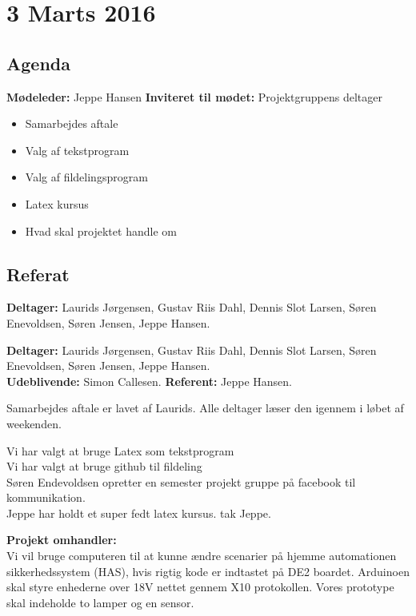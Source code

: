 \chapter*{3 Marts 2016}

\section*{Agenda}

\textbf{Mødeleder:} Jeppe Hansen
\textbf{Inviteret til mødet:} Projektgruppens deltager

\begin{itemize}
	\item Samarbejdes aftale
	\item Valg af tekstprogram
	\item Valg af fildelingsprogram
	\item Latex kursus
	\item Hvad skal projektet handle om
\end{itemize}

\section*{Referat}

\textbf{Deltager:} Laurids Jørgensen, Gustav Riis Dahl, Dennis Slot Larsen, Søren Enevoldsen, Søren Jensen, Jeppe Hansen.

\textbf{Deltager:} Laurids Jørgensen, Gustav Riis Dahl, Dennis Slot Larsen, Søren Enevoldsen, Søren Jensen, Jeppe Hansen. \\
\textbf{Udeblivende:} Simon Callesen.
\textbf{Referent:} Jeppe Hansen.

Samarbejdes aftale er lavet af Laurids. Alle deltager læser den igennem i løbet af weekenden.

Vi har valgt at bruge Latex som tekstprogram \\
Vi har valgt at bruge github til fildeling \\
Søren Endevoldsen opretter en semester projekt gruppe på facebook til kommunikation. \\
Jeppe har holdt et super fedt latex kursus. tak Jeppe.


\textbf{Projekt omhandler:} \\
Vi vil bruge computeren til at kunne ændre scenarier på hjemme automationen sikkerhedssystem (HAS), hvis rigtig kode er indtastet på DE2 boardet. Arduinoen skal styre enhederne over 18V nettet gennem X10 protokollen. Vores prototype skal indeholde to lamper og en sensor. 



